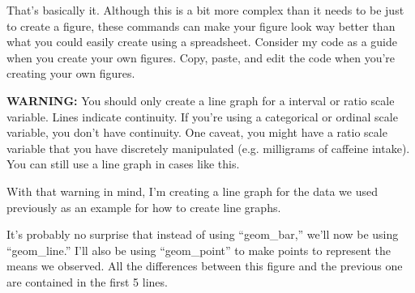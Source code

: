 \documentclass[12pt]{article}
\newcounter{subsubsubsection}[subsubsection]
\begin{document}
That's basically it. Although this is a bit more complex than it needs to be just
to create a figure, these commands can make your figure look way better than what
you could easily create using a spreadsheet. Consider my code as a guide when you
create your own figures. Copy, paste, and edit the code when you're creating your
own figures.

\textbf{WARNING:} You should only create a line graph for a interval or ratio
scale variable. Lines indicate continuity. If you're using a categorical or
ordinal scale variable, you don't have continuity. One caveat, you might have
a ratio scale variable that you have discretely manipulated (e.g. milligrams
of caffeine intake). You can still use a line graph in cases like this.

With that warning in mind, I'm creating a line graph for the data we used
previously as an example for how to create line graphs.

It's probably no surprise that instead of using ``geom\_bar,'' we'll now be using
``geom\_line.'' I'll also be using ``geom\_point'' to make points to represent the
means we observed. All the differences between this figure and the previous one
are contained in the first 5 lines.
\end{document}
